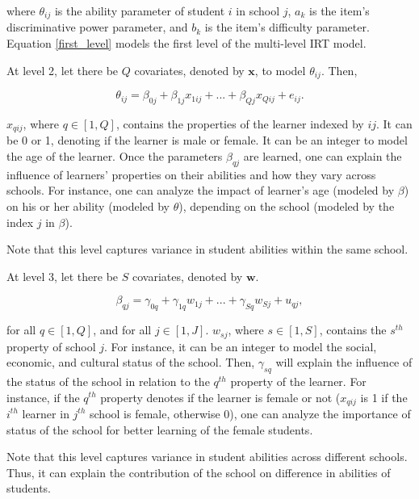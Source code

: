 \documentclass[12pt]{article}
\begin{document}
where $\theta_{ij}$ is the ability parameter of student $i$ in school $j$, $a_k$ is the item's discriminative power parameter, and $b_k$ is the item's difficulty parameter. Equation \eqref{first_level} models the first level of the multi-level IRT model.

At level 2, let there be $Q$ covariates, denoted by $\boldsymbol{x}$, to model $\theta_{ij}$. Then,

\begin{equation}\label{second_level}
    \theta_{ij} = \beta_{0j} + \beta_{1j}x_{1ij} + ... + \beta_{Qj}x_{Qij} + e_{ij}.
\end{equation}

$x_{qij}$, where $q \in [1, Q]$, contains the properties of the learner indexed by $ij$. It can be 0 or 1, denoting if the learner is male or female. It can be an integer to model the age of the learner. Once the parameters $\beta_{qj}$ are learned, one can explain the influence of learners' properties on their abilities and how they vary across schools. For instance, one can analyze the impact of learner's age (modeled by $\beta$) on his or her ability (modeled by $\theta$), depending on the school (modeled by the index $j$ in $\beta$).

Note that this level captures variance in student abilities within the same school.

At level 3, let there be $S$ covariates, denoted by $\boldsymbol{w}$.

\begin{equation}
    \beta_{qj} = \gamma_{0q} + \gamma_{1q}w_{1j} + ... + \gamma_{Sq}w_{Sj} + u_{qj},
\end{equation}

for all $q \in [1, Q]$, and for all $ j \in [1, J]$. $w_{sj}$, where $s \in [1, S]$, contains the $s^{th}$ property of school $j$. For instance, it can be an integer to model the social, economic, and cultural status of the school. Then, $\gamma_{sq}$ will explain the influence of the status of the school in relation to the $q^{th}$ property of the learner. For instance, if the $q^{th}$ property denotes if the learner is female or not ($x_{qij}$ is 1 if the $i^{th}$ learner in $j^{th}$ school is female, otherwise 0), one can analyze the importance of status of the school for better learning of the female students.

Note that this level captures variance in student abilities across different schools. Thus, it can explain the contribution of the school on difference in abilities of students.
\end{document}
